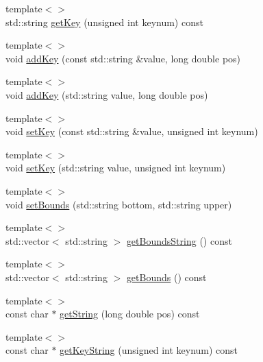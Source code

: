\begin{DoxyCompactItemize}
\item 
{\footnotesize template$<$$>$ }\\std\-::string \hyperlink{classmaudio_1_1SimpleKeyableProperty_a06900c85a334eb5770085a4758ad0711}{get\-Key} (unsigned int keynum) const
\item 
{\footnotesize template$<$$>$ }\\void \hyperlink{classmaudio_1_1SimpleKeyableProperty_aeb558a531fad8b7a997f3425be7a5b98}{add\-Key} (const std\-::string \&value, long double pos)
\item 
{\footnotesize template$<$$>$ }\\void \hyperlink{classmaudio_1_1SimpleKeyableProperty_adcc2030105e800fc71d1a25374b58554}{add\-Key} (std\-::string value, long double pos)
\item 
{\footnotesize template$<$$>$ }\\void \hyperlink{classmaudio_1_1SimpleKeyableProperty_a4031c824079fd6e619784324fa71528d}{set\-Key} (const std\-::string \&value, unsigned int keynum)
\item 
{\footnotesize template$<$$>$ }\\void \hyperlink{classmaudio_1_1SimpleKeyableProperty_a63cfcf99306b4e189556ed1f428a187c}{set\-Key} (std\-::string value, unsigned int keynum)
\item 
{\footnotesize template$<$$>$ }\\void \hyperlink{classmaudio_1_1SimpleKeyableProperty_af72906ce2cdfacbbae8cff72ae450e5a}{set\-Bounds} (std\-::string bottom, std\-::string upper)
\item 
{\footnotesize template$<$$>$ }\\std\-::vector$<$ std\-::string $>$ \hyperlink{classmaudio_1_1SimpleKeyableProperty_af442b75407c7a82f18faa1b552f2cb79}{get\-Bounds\-String} () const
\item 
{\footnotesize template$<$$>$ }\\std\-::vector$<$ std\-::string $>$ \hyperlink{classmaudio_1_1SimpleKeyableProperty_ad75a850801bc9ac0cba85ca619b8324f}{get\-Bounds} () const
\item 
{\footnotesize template$<$$>$ }\\const char $\ast$ \hyperlink{classmaudio_1_1SimpleKeyableProperty_a54bf26a66e66c717bc8cb3b64f830cab}{get\-String} (long double pos) const
\item 
{\footnotesize template$<$$>$ }\\const char $\ast$ \hyperlink{classmaudio_1_1SimpleKeyableProperty_a8a34984567fb8700030315bc23b1b900}{get\-Key\-String} (unsigned int keynum) const

\end{DoxyCompactItemize}
